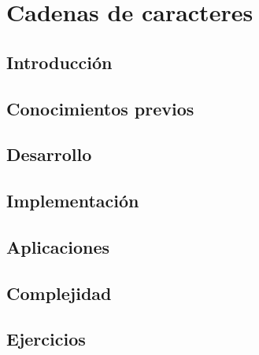 \chapter{Cadenas de caracteres}
\section{Introducción}

\section{Conocimientos previos}

\section{Desarrollo}

\section{Implementación}

\section{Aplicaciones}

\section{Complejidad}

\section{Ejercicios}
